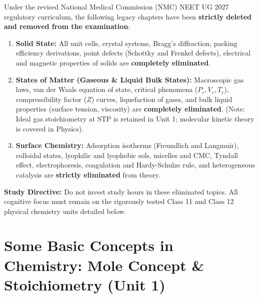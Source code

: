 \documentclass[10pt,twoside,openright]{book}
\begin{document}
\begin{trapbox}
Under the revised National Medical Commission (NMC) NEET UG 2027 regulatory curriculum, the following legacy chapters have been \textbf{strictly deleted and removed from the examination}:
\begin{enumerate}
  \item \textbf{Solid State:} All unit cells, crystal systems, Bragg's diffraction, packing efficiency derivations, point defects (Schottky and Frenkel defects), electrical and magnetic properties of solids are \textbf{completely eliminated}.
  \item \textbf{States of Matter (Gaseous \& Liquid Bulk States):} Macroscopic gas laws, van der Waals equation of state, critical phenomena ($P_c, V_c, T_c$), compressibility factor ($Z$) curves, liquefaction of gases, and bulk liquid properties (surface tension, viscosity) are \textbf{completely eliminated}. (Note: Ideal gas stoichiometry at STP is retained in Unit 1; molecular kinetic theory is covered in Physics).
  \item \textbf{Surface Chemistry:} Adsorption isotherms (Freundlich and Langmuir), colloidal states, lyophilic and lyophobic sols, micelles and CMC, Tyndall effect, electrophoresis, coagulation and Hardy-Schulze rule, and heterogeneous catalysis are \textbf{strictly eliminated} from theory.
\end{enumerate}
\textbf{Study Directive:} Do not invest study hours in these eliminated topics. All cognitive focus must remain on the rigorously tested Class 11 and Class 12 physical chemistry units detailed below.
\end{trapbox}

\section{Some Basic Concepts in Chemistry: Mole Concept \& Stoichiometry (Unit 1)}
\end{document}
